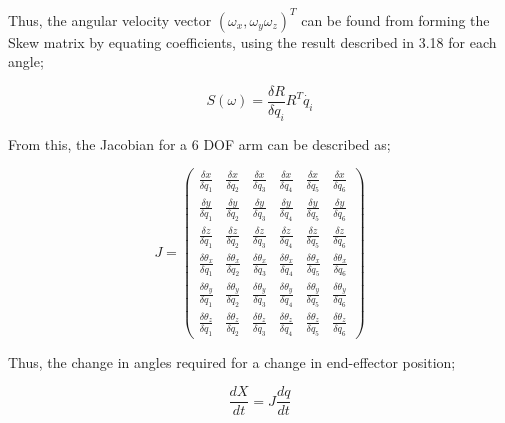\documentclass[12pt,openany,a4paper]{book}
\begin{document}
\vspace{\baselineskip}
Thus, the angular velocity vector $(\omega_x, \omega_y \omega_z)^T$ can be found from forming the Skew matrix by equating coefficients, using the result described in 3.18 for each angle;

\vspace{\baselineskip}
\begin{equation}
S(\omega) = \frac{\delta R}{\delta q_i} R^T \dot{q_i}
\end{equation}

\vspace{\baselineskip}

From this, the Jacobian for a 6 DOF arm can be described as;

\begin{equation}
J = 
\left(\begin{array}{cccccc} 
\frac{\delta x}{\delta q_1} & \frac{\delta x}{\delta q_2} & \frac{\delta x}{\delta q_3} & \frac{\delta x}{\delta q_4} & \frac{\delta x}{\delta q_5} & \frac{\delta x}{\delta q_6} \\ 
\frac{\delta y}{\delta q_1} & \frac{\delta y}{\delta q_2} & \frac{\delta y}{\delta q_3} & \frac{\delta y}{\delta q_4} & \frac{\delta y}{\delta q_5} & \frac{\delta y}{\delta q_6} \\ 
\frac{\delta z}{\delta q_1} & \frac{\delta z}{\delta q_2} & \frac{\delta z}{\delta q_3} & \frac{\delta z}{\delta q_4} & \frac{\delta z}{\delta q_5} & \frac{\delta z}{\delta q_6} \\ 
\frac{\delta \theta_x}{\delta q_1} & \frac{\delta \theta_x}{\delta q_2} & \frac{\delta \theta_x}{\delta q_3} & \frac{\delta \theta_x}{\delta q_4} & \frac{\delta \theta_x}{\delta q_5} & \frac{\delta \theta_x}{\delta q_6} \\ 
\frac{\delta \theta_y}{\delta q_1} & \frac{\delta \theta_y}{\delta q_2} & \frac{\delta \theta_y}{\delta q_3} & \frac{\delta \theta_y}{\delta q_4} & \frac{\delta \theta_y}{\delta q_5} & \frac{\delta \theta_y}{\delta q_6} \\ 
\frac{\delta \theta_z}{\delta q_1} & \frac{\delta \theta_z}{\delta q_2} & \frac{\delta \theta_z}{\delta q_3} & \frac{\delta \theta_z}{\delta q_4} & \frac{\delta \theta_z}{\delta q_5} & \frac{\delta \theta_z}{\delta q_6} 
\end{array}\right)
\end{equation}

Thus, the change in angles required for a change in end-effector position;

\vspace{\baselineskip}
\begin{equation}
\frac{dX}{dt} = J \frac{dq}{dt}
\end{equation}
\end{document}
